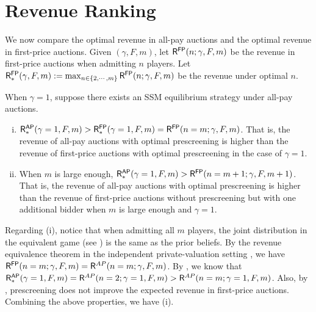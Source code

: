 

\section{Revenue Ranking}
\label{sec:rev_ranking}





We now compare the optimal revenue in all-pay auctions and the optimal revenue in first-price auctions.
Given $(\gamma,F,m)$, let $\mathsf{R}^{\mathsf{FP}}(n;\gamma,F,m)$ be the revenue in first-price auctions when admitting $n$ players. 
Let $\mathsf{R}_\ast^{\mathsf{FP}}(\gamma,F,m):=\max_{n\in \{2,\cdots,m\}}\mathsf{R}^{\mathsf{FP}}(n;\gamma,F,m)$ be the revenue under optimal $n$.

\begin{theorem}
\label{thm:rev_ranking}
When $\gamma=1$, suppose there exists an SSM equilibrium strategy under all-pay auctions.
\begin{enumerate}[(i)]
    \item $\mathsf{R}_\ast^{\mathsf{AP}}(\gamma=1,F,m)>\mathsf{R}_\ast^{\mathsf{FP}}(\gamma=1,F,m)=\mathsf{R}^{\mathsf{FP}}(n=m;\gamma,F,m)$.
    That is, the revenue of all-pay auctions with optimal prescreening is {} higher than the revenue of first-price auctions with optimal prescreening in the case of $\gamma=1$.
    
    \item When $m$ is large enough,  $\mathsf{R}_\ast^{\mathsf{AP}}(\gamma=1,F,m)> \mathsf{R}^{\mathsf{FP}}(n=m+1;\gamma,F,m+1)$.
    That is, the revenue of all-pay auctions with optimal prescreening is {} higher than the revenue of first-price auctions without prescreening but with one additional bidder when $m$ is large enough and $\gamma=1$.
\end{enumerate}
\end{theorem}



Regarding (i), notice that when admitting all $m$ players, the joint distribution in the equivalent game (see ) is the same as the prior beliefs. By the revenue equivalence theorem in the independent private-valuation setting \citep{myerson_1981_optimal_auction}, we have 
$\mathsf{R}^{\mathsf{FP}}(n=m;\gamma,F,m)=\mathsf{R}^{AP}(n=m;\gamma,F,m)$. By , we know that 
$\mathsf{R}_\ast^{\mathsf{AP}}(\gamma=1,F,m)=\mathsf{R}^{AP}(n=2;\gamma=1,F,m)>\mathsf{R}^{AP}(n=m;\gamma=1,F,m)$. Also, by , prescreening does not improve the expected revenue in first-price auctions. Combining the above properties, we have (i).

